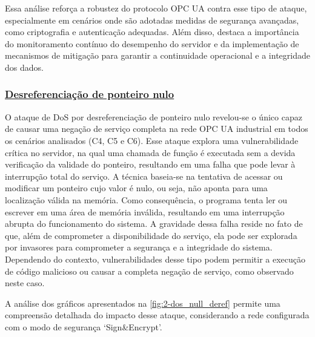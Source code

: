             Essa análise reforça a robustez do protocolo OPC UA contra esse tipo de ataque, especialmente em cenários onde são adotadas medidas de segurança avançadas, como criptografia e autenticação adequadas. Além disso, destaca a importância do monitoramento contínuo do desempenho do servidor e da implementação de mecanismos de mitigação para garantir a continuidade operacional e a integridade dos dados.

        \subsubsection*{\underline{Desreferenciação de ponteiro nulo}}

            O ataque de DoS por desreferenciação de ponteiro nulo revelou-se o único capaz de causar uma negação de serviço completa na rede OPC UA industrial em todos os cenários analisados (C4, C5 e C6). Esse ataque explora uma vulnerabilidade crítica no servidor, na qual uma chamada de função é executada sem a devida verificação da validade do ponteiro, resultando em uma falha que pode levar à interrupção total do serviço. A técnica baseia-se na tentativa de acessar ou modificar um ponteiro cujo valor é nulo, ou seja, não aponta para uma localização válida na memória. Como consequência, o programa tenta ler ou escrever em uma área de memória inválida, resultando em uma interrupção abrupta do funcionamento do sistema. A gravidade dessa falha reside no fato de que, além de comprometer a disponibilidade do serviço, ela pode ser explorada por invasores para comprometer a segurança e a integridade do sistema. Dependendo do contexto, vulnerabilidades desse tipo podem permitir a execução de código malicioso ou causar a completa negação de serviço, como observado neste caso.

            A análise dos gráficos apresentados na \autoref{fig:2-dos_null_deref} permite uma compreensão detalhada do impacto desse ataque, considerando a rede configurada com o modo de segurança `Sign\&Encrypt'.


